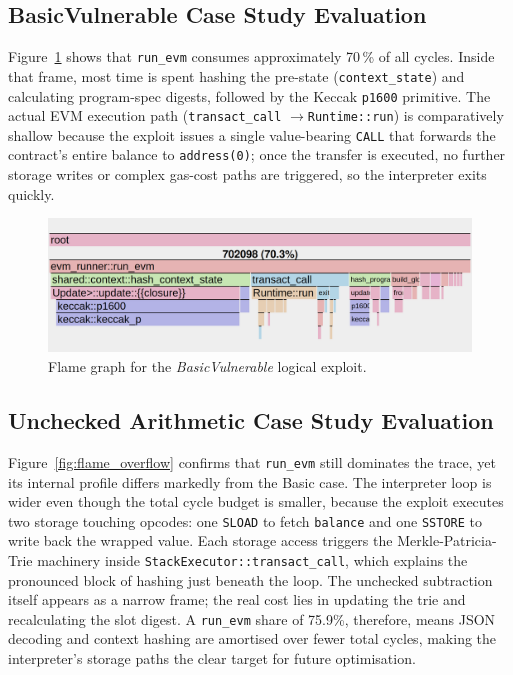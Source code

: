 \subsection{BasicVulnerable Case Study Evaluation}
Figure~\ref{fig:flame_basic} shows that \texttt{run\_evm} consumes approximately 70\,\% of all cycles. Inside that frame, most time is spent hashing the pre-state (\texttt{context\_state}) and calculating program-spec digests, followed by the Keccak \texttt{p1600} primitive. The actual EVM execution path (\texttt{transact\_call} \(\rightarrow\)\texttt{Runtime::run}) is comparatively shallow because the exploit issues a single value-bearing \texttt{CALL} that forwards the contract’s entire balance to \texttt{address(0)}; once the transfer is executed, no further storage writes or complex gas-cost paths are triggered, so the interpreter exits quickly.

\begin{figure}[h]
  \centering
  \includegraphics[width=\linewidth]{Images/Chap4/basicVulnerable_fg.png}
  \caption{Flame graph for the \textit{BasicVulnerable} logical exploit.}
  \label{fig:flame_basic}
\end{figure}

\subsection{Unchecked Arithmetic Case Study Evaluation}
Figure~\ref{fig:flame_overflow} confirms that \texttt{run\_evm} still dominates the trace, yet its internal profile differs markedly from the Basic case. The interpreter loop is wider even though the total cycle budget is smaller, because the exploit executes two storage touching opcodes: one \texttt{SLOAD} to fetch \texttt{balance} and one \texttt{SSTORE} to write back the wrapped value. Each storage access triggers the Merkle-Patricia-Trie machinery inside \texttt{StackExecutor::transact\_call}, which explains the pronounced block of hashing just beneath the loop.  The unchecked subtraction itself appears as a narrow frame; the real cost lies in updating the trie and recalculating the slot digest.  A \texttt{run\_evm} share of 75.9\%, therefore, means JSON decoding and context hashing are amortised over fewer total cycles, making the interpreter’s storage paths the clear target for future optimisation.


